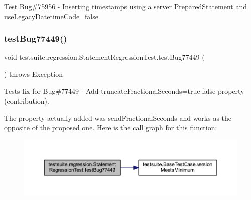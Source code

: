 Test Bug\#75956 -\/ Inserting timestamps using a server Prepared\+Statement and use\+Legacy\+Datetime\+Code=false \mbox{\label{classtestsuite_1_1regression_1_1_statement_regression_test_a07a77723b5e6ea623ee8d6c78d7786af}} 
\subsubsection{\texorpdfstring{test\+Bug77449()}{testBug77449()}}
{\footnotesize\ttfamily void testsuite.\+regression.\+Statement\+Regression\+Test.\+test\+Bug77449 (\begin{DoxyParamCaption}{ }\end{DoxyParamCaption}) throws Exception}

Tests fix for Bug\#77449 -\/ Add \textquotesingle{}truncate\+Fractional\+Seconds=true$\vert$false\textquotesingle{} property (contribution).

The property actually added was \textquotesingle{}send\+Fractional\+Seconds\textquotesingle{} and works as the opposite of the proposed one. Here is the call graph for this function\+:
\nopagebreak
\begin{figure}[H]
\begin{center}
\leavevmode
\includegraphics[width=350pt]{classtestsuite_1_1regression_1_1_statement_regression_test_a07a77723b5e6ea623ee8d6c78d7786af_cgraph}
\end{center}
\end{figure}
\mbox{\label{classtestsuite_1_1regression_1_1_statement_regression_test_adc52d5ddc30d4e6b82fb24fd1c544d26}} 
